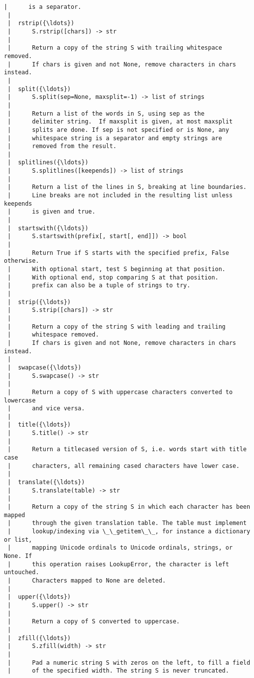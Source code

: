 \begin{Verbatim}[commandchars=\\\{\}]
 |      is a separator.
 |  
 |  rstrip({\ldots})
 |      S.rstrip([chars]) -> str
 |      
 |      Return a copy of the string S with trailing whitespace removed.
 |      If chars is given and not None, remove characters in chars instead.
 |  
 |  split({\ldots})
 |      S.split(sep=None, maxsplit=-1) -> list of strings
 |      
 |      Return a list of the words in S, using sep as the
 |      delimiter string.  If maxsplit is given, at most maxsplit
 |      splits are done. If sep is not specified or is None, any
 |      whitespace string is a separator and empty strings are
 |      removed from the result.
 |  
 |  splitlines({\ldots})
 |      S.splitlines([keepends]) -> list of strings
 |      
 |      Return a list of the lines in S, breaking at line boundaries.
 |      Line breaks are not included in the resulting list unless keepends
 |      is given and true.
 |  
 |  startswith({\ldots})
 |      S.startswith(prefix[, start[, end]]) -> bool
 |      
 |      Return True if S starts with the specified prefix, False otherwise.
 |      With optional start, test S beginning at that position.
 |      With optional end, stop comparing S at that position.
 |      prefix can also be a tuple of strings to try.
 |  
 |  strip({\ldots})
 |      S.strip([chars]) -> str
 |      
 |      Return a copy of the string S with leading and trailing
 |      whitespace removed.
 |      If chars is given and not None, remove characters in chars instead.
 |  
 |  swapcase({\ldots})
 |      S.swapcase() -> str
 |      
 |      Return a copy of S with uppercase characters converted to lowercase
 |      and vice versa.
 |  
 |  title({\ldots})
 |      S.title() -> str
 |      
 |      Return a titlecased version of S, i.e. words start with title case
 |      characters, all remaining cased characters have lower case.
 |  
 |  translate({\ldots})
 |      S.translate(table) -> str
 |      
 |      Return a copy of the string S in which each character has been mapped
 |      through the given translation table. The table must implement
 |      lookup/indexing via \_\_getitem\_\_, for instance a dictionary or list,
 |      mapping Unicode ordinals to Unicode ordinals, strings, or None. If
 |      this operation raises LookupError, the character is left untouched.
 |      Characters mapped to None are deleted.
 |  
 |  upper({\ldots})
 |      S.upper() -> str
 |      
 |      Return a copy of S converted to uppercase.
 |  
 |  zfill({\ldots})
 |      S.zfill(width) -> str
 |      
 |      Pad a numeric string S with zeros on the left, to fill a field
 |      of the specified width. The string S is never truncated.

\end{Verbatim}
